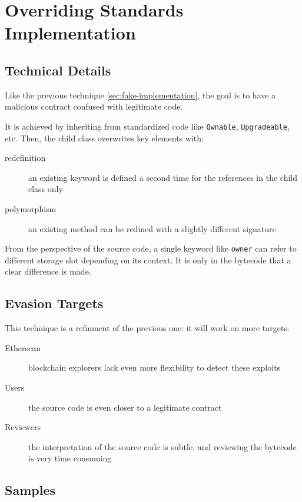 \section{Overriding Standards Implementation}

\subsection{Technical Details}

Like the previous technique \ref{sec:fake-implementation}, the goal is to have a malicious contract confused with legitimate code.

It is achieved by inheriting from standardized code like \lstinline{Ownable}, \lstinline{Upgradeable}, etc.
Then, the child class overwrites key elements with:

\begin{description}
\item[redefinition]{an existing keyword is defined a second time for the references in the child class only}
\item[polymorphism]{an existing method can be redined with a slightly different signature}
\end{description}

From the perspective of the source code, a single keyword like \lstinline{owner} can refer to different storage slot depending on its context.
It is only in the bytecode that a clear difference is made.

\subsection{Evasion Targets}

This technique is a refinment of the previous one: it will work on more targets.

\begin{description}
\item[Etherscan]{blockchain explorers lack  even more flexibility to detect these exploits}
\item[Users]{the source code is even closer to a legitimate contract}
\item[Reviewers]{the interpretation of the source code is subtle, and reviewing the bytecode is very time consuming}
\end{description}

\subsection{Samples}

